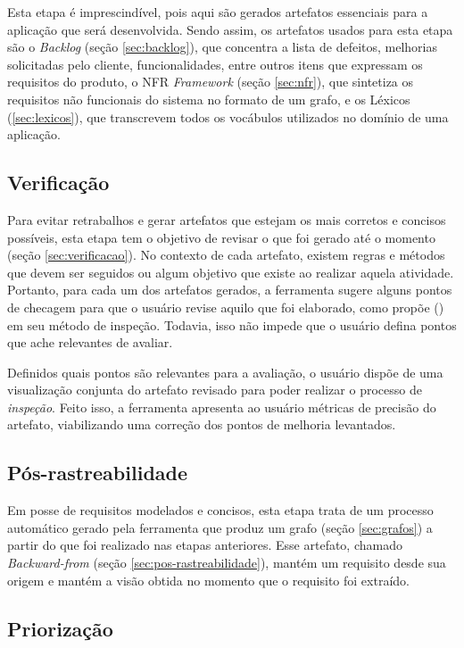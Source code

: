 Esta etapa é imprescindível, pois aqui são gerados artefatos essenciais para a aplicação que será desenvolvida. Sendo assim, os artefatos usados para esta etapa são o \textit{Backlog} (seção \ref{sec:backlog}), que concentra a lista de defeitos, melhorias solicitadas pelo cliente, funcionalidades, entre outros itens que expressam os requisitos do produto, o NFR \textit{Framework} (seção \ref{sec:nfr}), que sintetiza os requisitos não funcionais do sistema no formato de um grafo, e os Léxicos (\ref{sec:lexicos}), que transcrevem todos os vocábulos utilizados no domínio de uma aplicação.

\subsection{Verificação}

Para evitar retrabalhos e gerar artefatos que estejam os mais corretos e concisos possíveis, esta etapa tem o objetivo de revisar o que foi gerado até o momento (seção \ref{sec:verificacao}). No contexto de cada artefato, existem regras e métodos que devem ser seguidos ou algum objetivo que existe ao realizar aquela atividade. Portanto, para cada um dos artefatos gerados, a ferramenta sugere alguns pontos de checagem para que o usuário revise aquilo que foi elaborado, como propõe  (\citeyear{design_fagan}) em seu método de inspeção. Todavia, isso não impede que o usuário defina pontos que ache relevantes de avaliar.

Definidos quais pontos são relevantes para a avaliação, o usuário dispõe de uma visualização conjunta do artefato revisado para poder realizar o processo de \textit{inspeção}. Feito isso, a ferramenta apresenta ao usuário métricas de precisão do artefato, viabilizando uma correção dos pontos de melhoria levantados.

\subsection{Pós-rastreabilidade}

Em posse de requisitos modelados e concisos, esta etapa trata de um processo automático gerado pela ferramenta que produz um grafo (seção \ref{sec:grafos}) a partir do que foi realizado nas etapas anteriores. Esse artefato, chamado \textit{Backward-from} (seção \ref{sec:pos-rastreabilidade}), mantém um requisito desde sua origem e mantém a visão obtida no momento que o requisito foi extraído.

\subsection{Priorização}

